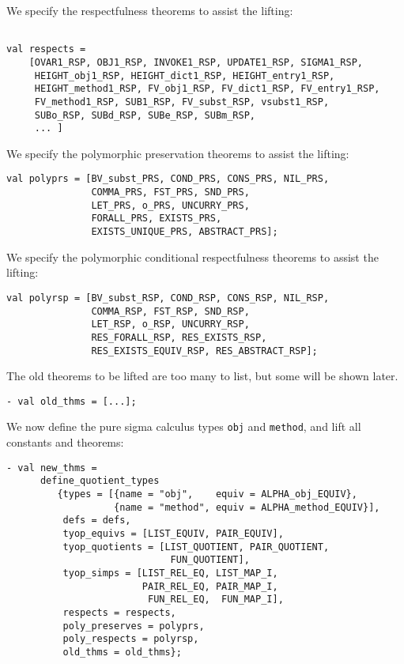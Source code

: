 \documentclass[envcountsame,runningheads]{llncs}
\begin{document}
We specify the respectfulness theorems to assist the lifting:
\begin{verbatim}

val respects =
    [OVAR1_RSP, OBJ1_RSP, INVOKE1_RSP, UPDATE1_RSP, SIGMA1_RSP,
     HEIGHT_obj1_RSP, HEIGHT_dict1_RSP, HEIGHT_entry1_RSP,
     HEIGHT_method1_RSP, FV_obj1_RSP, FV_dict1_RSP, FV_entry1_RSP,
     FV_method1_RSP, SUB1_RSP, FV_subst_RSP, vsubst1_RSP,
     SUBo_RSP, SUBd_RSP, SUBe_RSP, SUBm_RSP,
     ... ]
\end{verbatim}

We specify the polymorphic
preservation
theorems to assist the lifting:
\begin{verbatim}
val polyprs = [BV_subst_PRS, COND_PRS, CONS_PRS, NIL_PRS,
               COMMA_PRS, FST_PRS, SND_PRS,
               LET_PRS, o_PRS, UNCURRY_PRS,
               FORALL_PRS, EXISTS_PRS,
               EXISTS_UNIQUE_PRS, ABSTRACT_PRS];
\end{verbatim}

We specify the polymorphic conditional respectfulness theorems
to assist the lifting:
\begin{verbatim}
val polyrsp = [BV_subst_RSP, COND_RSP, CONS_RSP, NIL_RSP,
               COMMA_RSP, FST_RSP, SND_RSP,
               LET_RSP, o_RSP, UNCURRY_RSP,
               RES_FORALL_RSP, RES_EXISTS_RSP,
               RES_EXISTS_EQUIV_RSP, RES_ABSTRACT_RSP];
\end{verbatim}

The old theorems to be lifted are too many to list, but some will
be shown later.
\begin{verbatim}
- val old_thms = [...];
\end{verbatim}

We now define the pure sigma calculus types {\tt obj} and {\tt method},
and lift all constants and theorems:

\begin{verbatim}
- val new_thms =
      define_quotient_types
         {types = [{name = "obj",    equiv = ALPHA_obj_EQUIV},
                   {name = "method", equiv = ALPHA_method_EQUIV}],
          defs = defs,
          tyop_equivs = [LIST_EQUIV, PAIR_EQUIV],
          tyop_quotients = [LIST_QUOTIENT, PAIR_QUOTIENT,
                             FUN_QUOTIENT],
          tyop_simps = [LIST_REL_EQ, LIST_MAP_I,
                        PAIR_REL_EQ, PAIR_MAP_I,
                         FUN_REL_EQ,  FUN_MAP_I],
          respects = respects,
          poly_preserves = polyprs,
          poly_respects = polyrsp,
          old_thms = old_thms};
\end{verbatim}
\end{document}
